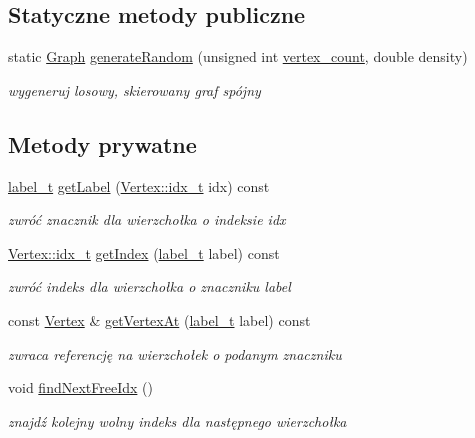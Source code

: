 \subsection*{Statyczne metody publiczne}
\begin{DoxyCompactItemize}
\item 
static \hyperlink{classGraph}{Graph} \hyperlink{classGraph_a84c0f0a47f1ccfc8587a571cc039daad}{generate\-Random} (unsigned int \hyperlink{classGraph_aa0961f75ec603fa6b4f1e631b70233f1}{vertex\-\_\-count}, double density)
\begin{DoxyCompactList}\small\item\em wygeneruj losowy, skierowany graf spójny \end{DoxyCompactList}\end{DoxyCompactItemize}
\subsection*{Metody prywatne}
\begin{DoxyCompactItemize}
\item 
\hyperlink{classGraph_a2237a0ada8484c37b8200c0e3685ca71}{label\-\_\-t} \hyperlink{classGraph_ad2c5979f339ecee307f980972a088342}{get\-Label} (\hyperlink{classVertex_a12fe2194264f72b70b284bba723052c1}{Vertex\-::idx\-\_\-t} idx) const 
\begin{DoxyCompactList}\small\item\em zwróć znacznik dla wierzchołka o indeksie idx \end{DoxyCompactList}\item 
\hyperlink{classVertex_a12fe2194264f72b70b284bba723052c1}{Vertex\-::idx\-\_\-t} \hyperlink{classGraph_acefa9a82c8dfa36713c8fe15000cd2ac}{get\-Index} (\hyperlink{classGraph_a2237a0ada8484c37b8200c0e3685ca71}{label\-\_\-t} label) const 
\begin{DoxyCompactList}\small\item\em zwróć indeks dla wierzchołka o znaczniku label \end{DoxyCompactList}\item 
const \hyperlink{classVertex}{Vertex} \& \hyperlink{classGraph_a949e2c8794a3c1dc85b4f6dc4e76f843}{get\-Vertex\-At} (\hyperlink{classGraph_a2237a0ada8484c37b8200c0e3685ca71}{label\-\_\-t} label) const 
\begin{DoxyCompactList}\small\item\em zwraca referencję na wierzchołek o podanym znaczniku \end{DoxyCompactList}\item 
void \hyperlink{classGraph_ae971bb36c7c46b65f4ba7c4902bf4c53}{find\-Next\-Free\-Idx} ()
\begin{DoxyCompactList}\small\item\em znajdź kolejny wolny indeks dla następnego wierzchołka \end{DoxyCompactList}\end{DoxyCompactItemize}
